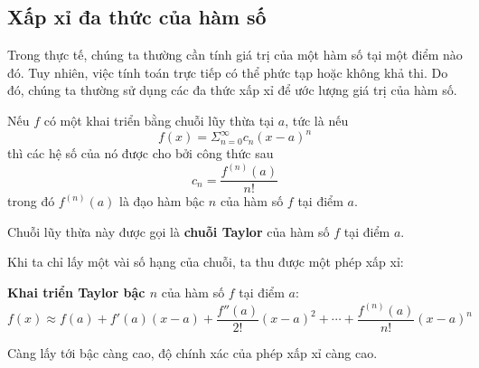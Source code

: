 \subsection{Xấp xỉ đa thức của hàm số}
Trong thực tế, chúng ta thường cần tính giá trị của một hàm số tại một điểm nào đó. Tuy nhiên, việc tính toán trực tiếp có thể phức tạp hoặc không khả thi. Do đó, chúng ta thường sử dụng các đa thức xấp xỉ để ước lượng giá trị của hàm số.
\begin{theorem}
Nếu \(f\) có một khai triển bằng chuỗi lũy thừa tại \(a\), tức là nếu
\begin{equation}
f(x)=\Sigma_{n=0}^{\infty}c_n(x-a)^n
\end{equation}
thì các hệ số của nó được cho bởi công thức sau
\begin{equation}
c_n=\frac{f^{(n)}(a)}{n!}
\end{equation}
trong đó \(f^{(n)}(a)\) là đạo hàm bậc \(n\) của hàm số \(f\) tại điểm \(a\).

Chuỗi lũy thừa này được gọi là \textbf{chuỗi Taylor} của hàm số \(f\) tại điểm \(a\).
\end{theorem}
Khi ta chỉ lấy một vài số hạng của chuỗi, ta thu được một phép xấp xỉ:
\begin{definition}
\textbf{Khai triển Taylor bậc \(n\)} của hàm số \(f\) tại điểm \(a\):
\begin{equation}
f(x)\approx f(a)+f'(a)(x-a)+\frac{f''(a)}{2!}(x-a)^2+\cdots+\frac{f^{(n)}(a)}{n!}(x-a)^n
\end{equation}
\end{definition}
Càng lấy tới bậc càng cao, độ chính xác của phép xấp xỉ càng cao.